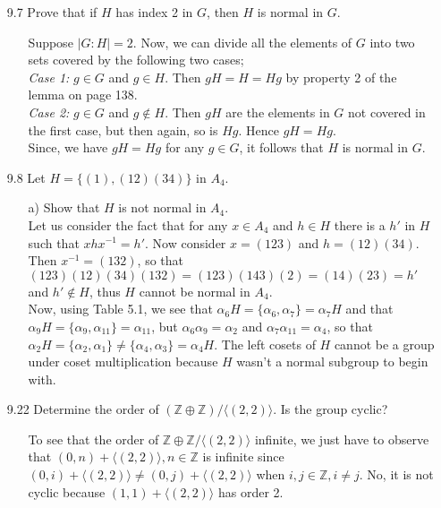 \documentclass[12pt]{article}
\begin{document}
\begin{enumerate}
\item[9.7] Prove that if $H$ has index 2 in $G$, then $H$ is normal in $G$.
\begin{enumerate}
\item[] Suppose $|G:H| = 2$. Now, we can divide all the elements of $G$ into two sets 
covered by the following two cases; \\
\emph{Case 1:} $g \in G$ and $g \in H$. Then $gH = H = Hg$ by property 2 of the lemma on page 138. \\
\emph{Case 2:} $g \in G$ and $g \not\in H$. Then $gH$ are the elements in $G$ not covered in the first
case, but then again, so is $Hg$. Hence $gH = Hg$. \\
Since, we have $gH = Hg$ for any $g \in G$, it follows that $H$ is normal in $G$.
\end{enumerate}

\item[9.8] Let $H = \{ (1), (12)(34) \}$ in $A_4$.
\begin{enumerate}
\item[a)] Show that $H$ is not normal in $A_4$. \\
Let us consider the fact that for any $x \in A_4$ and $h \in H$ there is a $h'$ in 
$H$ such that $xhx^{-1} = h'$. Now consider $x = (123)$ and $h = (12)(34)$. Then $x^{-1} = (132)$, 
so that $(123)(12)(34)(132) = (123)(143)(2) = (14)(23) = h'$ and $h' \not\in H$, thus $H$ cannot
be normal in $A_4$. \\
Now, using Table 5.1, we see that $\alpha_6H = \{ \alpha_6, \alpha_7 \} = \alpha_7H$ and that 
$\alpha_9H = \{ \alpha_9, \alpha_{11} \} = \alpha_{11}$, but $\alpha_6\alpha_9 = \alpha_2$ and
$\alpha_7\alpha_{11} = \alpha_4$, so that $\alpha_2H = \{ \alpha_2, \alpha_1 \} \neq \{
\alpha_4, \alpha_3 \} = \alpha_4H$. The left cosets of $H$ cannot be a group under coset multiplication
because $H$ wasn't a normal subgroup to begin with.
\end{enumerate}

\item[9.22] Determine the order of $(\mathbb{Z} \oplus \mathbb{Z})/\langle (2, 2)\rangle$.
Is the group cyclic?
\begin{enumerate}
\item[] To see that the order of $\mathbb{Z} \oplus \mathbb{Z}/\langle (2, 2)\rangle$ infinite, we just
have to observe that $(0, n) + \langle (2, 2)\rangle, n \in \mathbb{Z}$ is infinite since 
$(0, i) + \langle (2, 2)\rangle \neq (0, j) + \langle (2, 2)\rangle$ when $i, j \in \mathbb{Z}, i \neq j$.
No, it is not cyclic because $(1, 1) + \langle (2, 2)\rangle$ has order 2.
\end{enumerate}


\end{enumerate}
\end{document}

